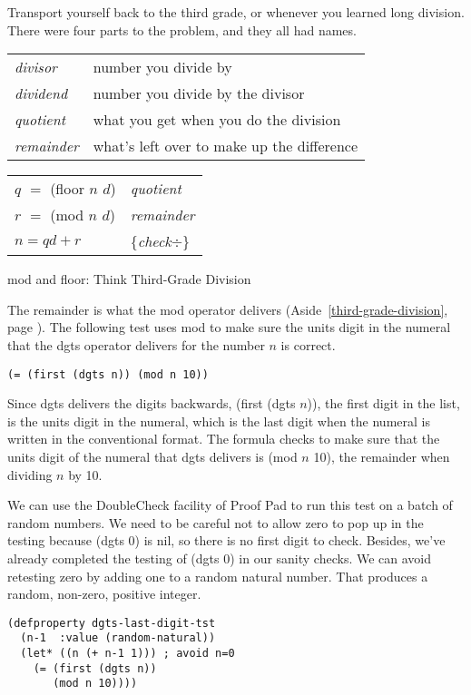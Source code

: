 \begin{aside}
Transport yourself back to the third grade,
or whenever you learned long division.
There were four parts to the problem, and they all had names.

\begin{tabular}{ll}
\emph{divisor}   & number you divide by \\
\emph{dividend}  & number you divide by the divisor \\
\emph{quotient}  & what you get when you do the division \\
\emph{remainder} & what's left over to make up the difference
\end{tabular}
\begin{center}
\begin{tabular}{ll}
$q$ $=$ \textsf{(floor $n$ $d$)} & \emph{quotient}  \\
$r$ $=$ \textsf{(mod $n$ $d$)}   & \emph{remainder} \\
$n = qd + r$            & \{\emph{check}$\div$\} \\
\end{tabular}
\end{center}
\caption{\textsf{mod} and \textsf{floor}: Think Third-Grade Division}
\label{third-grade-division}
\end{aside}

The remainder is
what the \textsf{mod} operator delivers
(Aside~\ref{third-grade-division}, page \pageref{third-grade-division}).
The following test uses \textsf{mod} to make sure the units digit in the numeral
that the \textsf{dgts} operator delivers for the number $n$ is correct.
\begin{Verbatim}
(= (first (dgts n)) (mod n 10))
\end{Verbatim}

Since \textsf{dgts} delivers the digits backwards,
\textsf{(first (dgts $n$))}, the first digit in the list,
is the units digit in the numeral, which is the last digit
when the numeral is written in the conventional format.
The formula checks to make sure that
the units digit of the numeral that
\textsf{dgts} delivers is \textsf{(mod $n$ 10)},
the remainder when dividing $n$ by 10.

We can use the DoubleCheck facility of Proof Pad to run this test on a batch of random numbers.
We need to be careful not to allow zero to pop up in the testing
because \textsf{(dgts 0)} is nil, so there is no first digit to check.
Besides, we've already completed the testing of \textsf{(dgts 0)} in our sanity checks.
We can avoid retesting zero by adding one to a random natural number.
That produces a random, non-zero, positive integer.
\begin{Verbatim}
(defproperty dgts-last-digit-tst
  (n-1  :value (random-natural))
  (let* ((n (+ n-1 1))) ; avoid n=0
    (= (first (dgts n))
       (mod n 10))))
\end{Verbatim}

